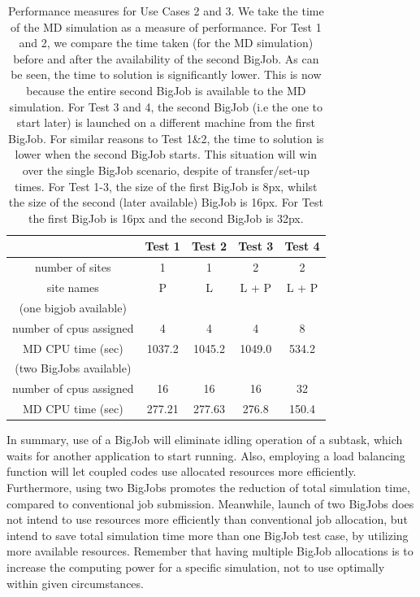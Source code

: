 \documentclass[conference,final]{IEEEtran}
\begin{document}
\begin{table}[!h]
\begin{center}
 \caption{\small
Performance measures for Use Cases 2 and 3. We take the time of the MD simulation as a measure of performance.
For Test 1 and 2, we compare the time taken (for the MD simulation) before and after the availability of
the second BigJob. As can be seen, the time to solution is significantly lower. This is now because
the entire second BigJob is available to the MD simulation.
For Test 3 and 4, the second BigJob (i.e the one to start later) is launched on a different machine
from the first BigJob. For similar reasons to Test 1\&2, the time to solution is lower when the
second BigJob starts. This situation will win over the single BigJob scenario, despite of transfer/set-up times. For Test 1-3, the size of the first BigJob is 8px, whilst the size of the second (later available) BigJob is 16px. For Test the first BigJob is 16px and the second BigJob is 32px.}
\label{table:TwoBigJobs}
\begin{tabular}{ c| c c c c }
\hline
& Test 1   & Test 2 & Test 3   & Test 4 \\
\hline
number of sites & 1 & 1 & 2 & 2  \\
site names & P & L  & L + P & L + P \\
\hline
(one bigjob available) & & & & \\
number of cpus assigned & 4 & 4 & 4 & 8 \\
MD CPU time  (sec) & 1037.2 & 1045.2 & 1049.0 & 534.2  \\
\hline
(two BigJobs available) & & & & \\
number of cpus assigned & 16 & 16 & 16 & 32 \\

MD CPU time  (sec) & 277.21 & 277.63  & 276.8 & 150.4  \\

\hline
\end{tabular}
\end{center}
\end{table}


In summary, use of a BigJob will eliminate idling operation of a subtask, which waits for another application to start running. Also, employing a load balancing function will let coupled codes use allocated resources more efficiently. Furthermore, using two BigJobs promotes the reduction of total simulation time, compared to conventional job submission. Meanwhile, launch of two BigJobs does not intend to use resources more efficiently than conventional job allocation, but intend to save total simulation time more than one BigJob test case, by utilizing more available resources. Remember that having multiple BigJob allocations is to increase the computing power for a specific simulation, not to use optimally within given circumstances.
\end{document}
